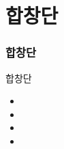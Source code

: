 \documentclass[aspectratio=1610,17pt,xcolor=pdftex,dvipsnames,table,handout]{beamer}
\begin{document}
		\section{ 합창단 }
		\begin{frame} [t,plain]
		\frametitle{합창단 }
			\begin{block} { 합창단 }
			\setlength{\leftmargini}{4em}			
			\begin{itemize}
				\item 
				\item 
				\item 
				\item 
			\end{itemize}
			\end{block}						
								
		\end{frame} 	%


\end{document}
